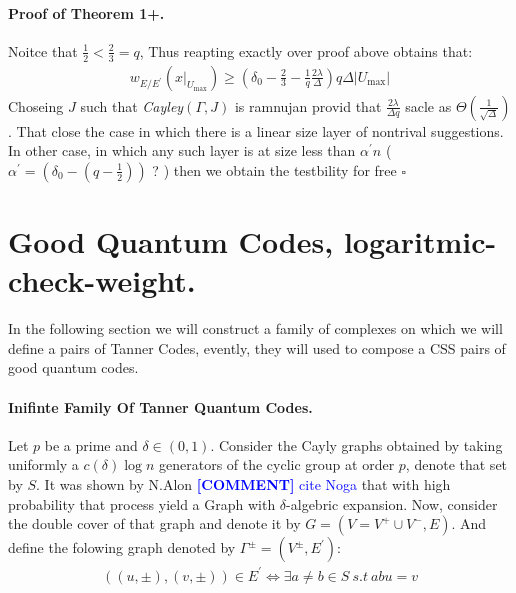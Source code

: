 \documentclass[sigplan,screen]{acmart}
\newcommand{\commentt}[1]{\textcolor{blue}{ \textbf{[COMMENT]} #1}}
\newcommand{\ctt}[1]{\commentt{#1}}
\begin{document}
\begin{multicols*}{2}
  \paragraph{Proof of Theorem 1+.} Noitce that $\frac{1}{2} < \frac{2}{3} = q$, Thus reapting exactly over proof above obtains that: 
  \begin{equation*}
    \begin{split}
      w_{E/E^{\prime}}\left( x|_{U_{\text{max}}} \right) \ge \left( \delta_{0} - \frac{2}{3} - \frac{1}{q}\frac{2\lambda}{\Delta} \right)q\Delta |U_{\text{max}}|
    \end{split}
  \end{equation*}
  Choseing $J$ such that \emph{Cayley}$\left( \Gamma, J \right)$ is ramnujan provid that $ \frac{2\lambda}{\Delta q}$ sacle as $\Theta\left( \frac{1}{\sqrt{\Delta}} \right)$. That close the case in which there is a linear size layer of nontrival suggestions. In other case, in which any such layer is at size less than $\alpha^{\prime}n$ ( $\alpha^{\prime} = \left( \delta_{0} - \left( q - \frac{1}{2} \right) \right)$ ? ) then we obtain the testbility for free $\square$
      \section{Good Quantum Codes, logaritmic-check-weight.} 
In the following section we will construct a family of complexes on which we will define a pairs of Tanner Codes, evently, they will used to compose a CSS pairs of good quantum codes.  
  \paragraph{Inifinte Family Of Tanner Quantum Codes.} 
  Let $p$ be a prime and $\delta \in \left( 0,1 \right)$. Consider the Cayly graphs obtained by taking uniformly a $c\left( \delta \right)\log n$ generators of the cyclic group at order $p$, denote that set by $S$. It was shown by N.Alon \ctt{cite Noga} that with high probability that process yield a Graph with $\delta$-algebric expansion. Now, consider the double cover of that graph and denote it by $G = \left( V = V^{+} \cup V^{-},E \right)$. And define the folowing graph denoted by $\Gamma^{\pm} = \left(V^{\pm}, E^{\prime}\right)$:
  \begin{equation*}
    \begin{split}
      \left( \left(u , \pm  \right), \left( v, \pm \right) \right) \in  E^{\prime} \Leftrightarrow \exists a\neq b \in S \ s.t \ abu = v     
    \end{split}
  \end{equation*}
     


\end{multicols*}
\end{document}
